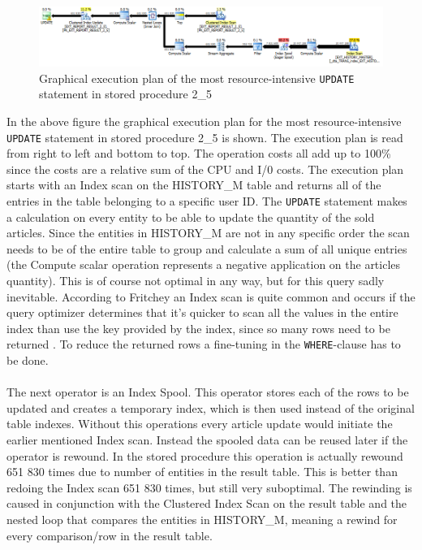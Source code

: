 \documentclass{cslthse-msc}
\begin{document}
\begin{figure}[H]
\hspace*{-2cm}
\includegraphics[scale=0.8]{Pictures/plan.png}
\caption{Graphical execution plan of the most resource-intensive \texttt{UPDATE} statement in stored procedure 2\_5}
\label{2_5 ep}
\end{figure}
\noindent In the above figure the graphical execution plan for the most resource-intensive \texttt{UPDATE} statement in stored procedure 2\_5 is shown. The execution plan is read from right to left and bottom to top. The operation costs all add up to 100\% since the costs are a relative sum of the CPU and I/0 costs. The execution plan starts with an Index scan on the HISTORY\_M table and returns all of the entries in the table belonging to a specific user ID. The \texttt{UPDATE} statement makes a calculation on every entity to be able to update the quantity of the sold articles. Since the entities in HISTORY\_M are not in any specific order the scan needs to be of the entire table to group and calculate a sum of all unique entries (the Compute scalar operation represents a negative application on the articles quantity). This is of course not optimal in any way, but for this query sadly inevitable. According to Fritchey an Index scan is quite common and occurs if the query optimizer determines that it's quicker to scan all the values in the entire index than use the key provided by the index, since so many rows need to be returned \cite{fritchey}. To reduce the returned rows a fine-tuning in the \texttt{WHERE}-clause has to be done. \\\\ 
The next operator is an Index Spool. This operator stores each of the rows to be updated and creates a temporary index, which is then used instead of the original table indexes. Without this operations every article update would initiate the earlier mentioned Index scan. Instead the spooled data can be reused later if the operator is rewound. In the stored procedure this operation is actually rewound 651 830 times due to number of entities in the result table. This is better than redoing the Index scan 651 830 times, but still very suboptimal. The rewinding is caused in conjunction with the Clustered Index Scan on the result table and the nested loop that compares the entities in HISTORY\_M, meaning a rewind for every comparison/row in the result table.\\\\
\end{document}
